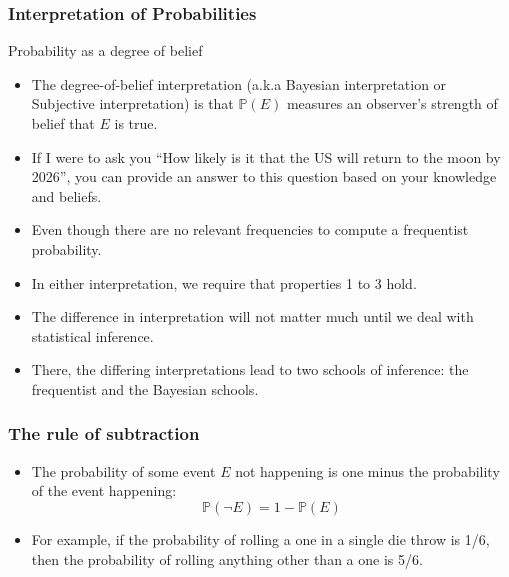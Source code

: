 \documentclass[handout]{beamer}
\begin{document}
\begin{frame}\frametitle{Interpretation of Probabilities}
\begin{scriptsize}


\begin{block}{Probability as a degree of belief}
\begin{itemize} 
\item The degree-of-belief interpretation (a.k.a Bayesian interpretation or Subjective interpretation) is that $\mathbb{P}(E)$ measures an observer's strength of belief that $E$ is true.
\item If I were to ask you ``How likely is it that the US will return to the moon by 2026'', you can provide an answer to this question based on your knowledge and beliefs.
\item Even though there are no relevant frequencies to compute a frequentist probability.
\end{itemize}
\end{block}

\begin{itemize}
\item In either interpretation, we require that properties 1 to 3 hold.
\item The difference in interpretation will not matter much until we deal with statistical inference. 
\item There, the differing interpretations lead to two schools of inference: the frequentist and the Bayesian schools.
\end{itemize} 



\end{scriptsize} 

\end{frame}


\begin{frame}\frametitle{The rule of subtraction}
\scriptsize{

\begin{itemize}
 \item The probability of some event $E$ not happening is one minus the probability of the event happening:
 \begin{displaymath}
 \mathbb{P}(\neg E) = 1 - \mathbb{P}(E) 
 \end{displaymath}
\item For example, if the probability of rolling a one in a single die throw is 1/6, then the probability of rolling anything other than a one is 5/6.
 
\end{itemize}

}

\end{frame}
\end{document}

